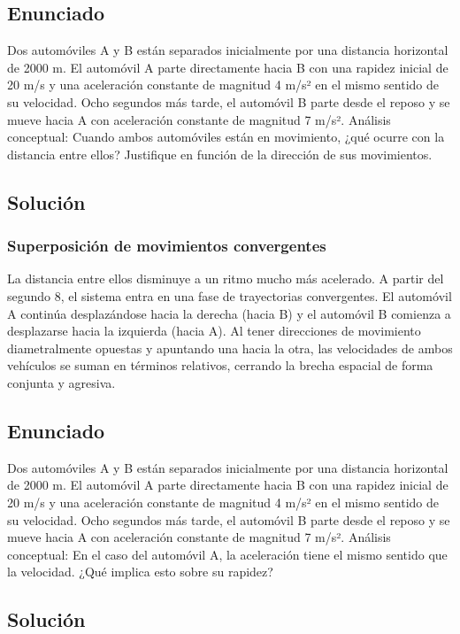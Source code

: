 \documentclass[12pt, a4paper]{article}
\begin{document}
\newpage
\subsection*{Enunciado}
 Dos automóviles A y B están separados inicialmente por una distancia horizontal de 2000 m. El automóvil A parte directamente hacia B con una rapidez inicial de 20 m/s y una aceleración constante de magnitud 4 m/s² en el mismo sentido de su velocidad. Ocho segundos más tarde, el automóvil B parte desde el reposo y se mueve hacia A con aceleración constante de magnitud 7 m/s².
 Análisis conceptual: Cuando ambos automóviles están en movimiento, ¿qué ocurre con la distancia entre ellos? Justifique en función de la dirección de sus movimientos.

\subsection*{Solución}

\subsubsection*{Superposición de movimientos convergentes}
La distancia entre ellos disminuye a un ritmo mucho más acelerado. A partir del segundo 8, el sistema entra en una fase de trayectorias convergentes. El automóvil A continúa desplazándose hacia la derecha (hacia B) y el automóvil B comienza a desplazarse hacia la izquierda (hacia A). Al tener direcciones de movimiento diametralmente opuestas y apuntando una hacia la otra, las velocidades de ambos vehículos se suman en términos relativos, cerrando la brecha espacial de forma conjunta y agresiva.

\newpage
\subsection*{Enunciado}
Dos automóviles A y B están separados inicialmente por una distancia horizontal de 2000 m. El automóvil A parte directamente hacia B con una rapidez inicial de 20 m/s y una aceleración constante de magnitud 4 m/s² en el mismo sentido de su velocidad. Ocho segundos más tarde, el automóvil B parte desde el reposo y se mueve hacia A con aceleración constante de magnitud 7 m/s².
Análisis conceptual: En el caso del automóvil A, la aceleración tiene el mismo sentido que la velocidad. ¿Qué implica esto sobre su rapidez?

\subsection*{Solución}
\end{document}
